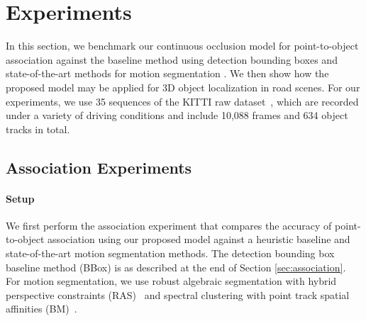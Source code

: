 \section{Experiments}
\label{sec:experiments}

In this section, we benchmark our continuous occlusion model for point-to-object association against the baseline method using detection bounding boxes and state-of-the-art methods for motion segmentation \cite{Rao_etal_2010,Brox_Malik_2010}. We then show how the proposed model may be applied for 3D object localization in road scenes. For our experiments, we use 35 sequences of the KITTI raw dataset~\cite{Geiger_etal_2012}, which are recorded under a variety of driving conditions and include 10,088 frames and 634 object tracks in total. 






\subsection{Association Experiments}
\paragraph{Setup}
We first perform the association experiment that compares the accuracy of point-to-object association using our proposed model against a heuristic baseline and state-of-the-art motion segmentation methods. The detection bounding box baseline method (BBox) is as described at the end of Section \ref{sec:association}. For motion segmentation, we use robust algebraic segmentation with hybrid perspective constraints (RAS)~\cite{Rao_etal_2010} and spectral clustering with point track spatial affinities (BM)~\cite{Brox_Malik_2010}.


